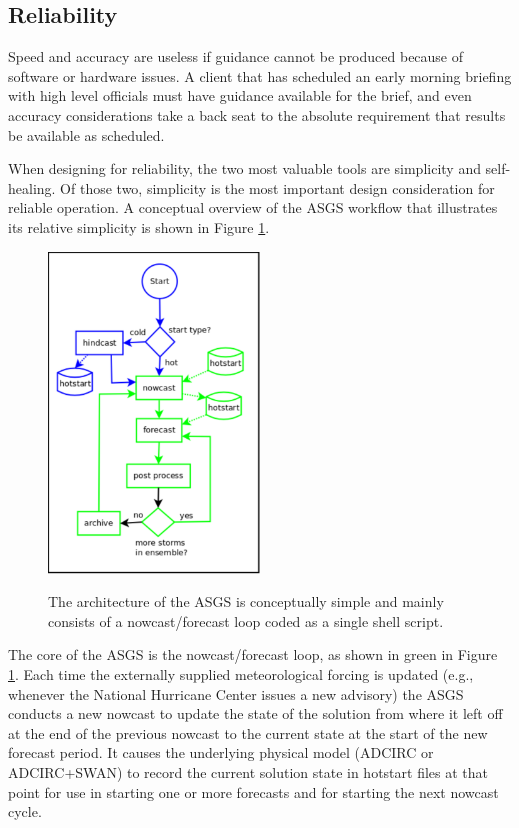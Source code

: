 \documentclass[jmse,article,submit,moreauthors,pdftex,12pt,a4paper]{mdpi}
\begin{document}
\subsection{Reliability}

Speed and accuracy are useless if guidance cannot be produced 
because of software or hardware issues. A client that has scheduled 
an early morning briefing with high level officials must have 
guidance available for the brief, and even accuracy considerations 
take a back seat to the absolute requirement that results be 
available as scheduled. 

When designing for reliability, the two most valuable tools are 
simplicity and self-healing. Of those two, simplicity is the most 
important design consideration for reliable operation. A conceptual 
overview of the ASGS workflow that illustrates its relative 
simplicity is shown in Figure \ref{fig:asgs_overview}.

\begin{figure}[t]
  \centering
  \includegraphics[width=0.5\textwidth]{asgs_overview_color}\\
  \caption{The architecture of the ASGS is conceptually simple and mainly consists of a nowcast/forecast loop coded as a single shell script.}
  \label{fig:asgs_overview}
\end{figure}

The core of the ASGS is the nowcast/forecast loop, as shown in green 
in Figure \ref{fig:asgs_overview}. Each time the externally supplied 
meteorological forcing is updated (e.g., whenever the National 
Hurricane Center issues a new advisory) the ASGS conducts a new 
nowcast to update the state of the solution from where it left off 
at the end of the previous nowcast to the current state at the start 
of the new forecast period. It causes the underlying physical model 
(ADCIRC or ADCIRC+SWAN) to record the current solution state in 
hotstart files at that point for use in starting one or more 
forecasts and for starting the next nowcast cycle. 
\end{document}

